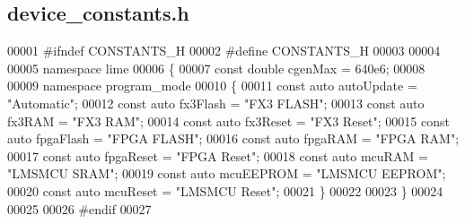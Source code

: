 \subsection{device\+\_\+constants.\+h}
\label{device__constants_8h_source}

\begin{DoxyCode}
00001 \textcolor{preprocessor}{#ifndef CONSTANTS\_H}
00002 \textcolor{preprocessor}{#define CONSTANTS\_H}
00003 
00004 
00005 \textcolor{keyword}{namespace }lime
00006 \{
00007     \textcolor{keyword}{const} \textcolor{keywordtype}{double} cgenMax = 640e6;
00008     
00009     \textcolor{keyword}{namespace }program\_mode
00010     \{
00011         \textcolor{keyword}{const} \textcolor{keyword}{auto} autoUpdate = \textcolor{stringliteral}{"Automatic"};
00012         \textcolor{keyword}{const} \textcolor{keyword}{auto} fx3Flash = \textcolor{stringliteral}{"FX3 FLASH"};
00013         \textcolor{keyword}{const} \textcolor{keyword}{auto} fx3RAM = \textcolor{stringliteral}{"FX3 RAM"};
00014         \textcolor{keyword}{const} \textcolor{keyword}{auto} fx3Reset = \textcolor{stringliteral}{"FX3 Reset"};       
00015         \textcolor{keyword}{const} \textcolor{keyword}{auto} fpgaFlash = \textcolor{stringliteral}{"FPGA FLASH"};
00016         \textcolor{keyword}{const} \textcolor{keyword}{auto} fpgaRAM = \textcolor{stringliteral}{"FPGA RAM"};
00017         \textcolor{keyword}{const} \textcolor{keyword}{auto} fpgaReset = \textcolor{stringliteral}{"FPGA Reset"};   
00018         \textcolor{keyword}{const} \textcolor{keyword}{auto} mcuRAM = \textcolor{stringliteral}{"LMSMCU SRAM"};
00019         \textcolor{keyword}{const} \textcolor{keyword}{auto} mcuEEPROM = \textcolor{stringliteral}{"LMSMCU EEPROM"};
00020         \textcolor{keyword}{const} \textcolor{keyword}{auto} mcuReset = \textcolor{stringliteral}{"LMSMCU Reset"};  
00021     \}
00022     
00023 \}
00024 
00025 
00026 \textcolor{preprocessor}{#endif  }
00027 
\end{DoxyCode}
